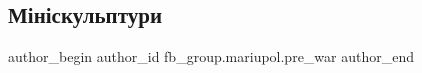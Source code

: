 
 
 
 
 

\subsection{Мініскульптури}
\label{sec:20_01_2023.fb.fb_group.mariupol.pre_war.6.miniskulptury_nilsen}

\ifcmt
 author_begin
   author_id fb_group.mariupol.pre_war
 author_end
\fi
